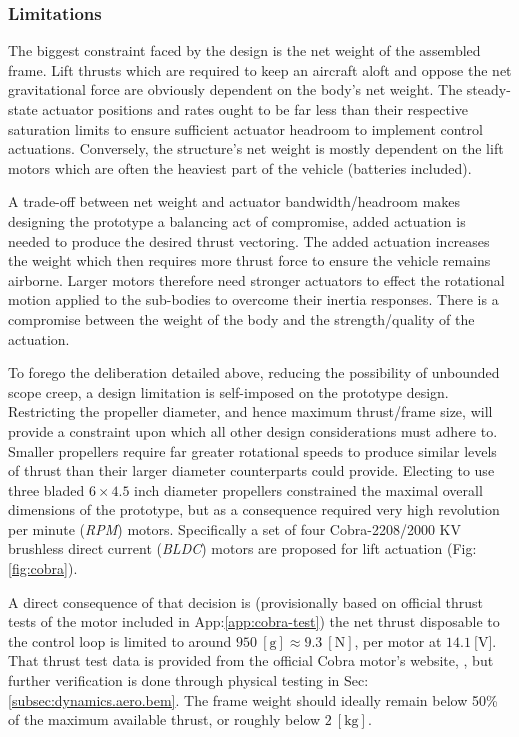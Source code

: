 \subsubsection{Limitations}
\label{subsubsec:intro.foreword.limits}
The biggest constraint faced by the design is the net weight of the assembled frame. Lift thrusts which are required to keep an aircraft aloft and oppose the net gravitational force are obviously dependent on the body's net weight. The steady-state actuator positions and rates ought to be far less than their respective saturation limits to ensure sufficient actuator headroom to implement control actuations. Conversely, the structure's net weight is mostly dependent on the lift motors which are often the heaviest part of the vehicle (batteries included). 
\par
A trade-off between net weight and actuator bandwidth/headroom makes designing the prototype a balancing act of compromise, added actuation is needed to produce the desired thrust vectoring. The added actuation increases the weight which then requires more thrust force to ensure the vehicle remains airborne. Larger motors therefore need stronger actuators to effect the rotational motion applied to the sub-bodies to overcome their inertia responses. There is a compromise between the weight of the body and the strength/quality of the actuation.
\par
To forego the deliberation detailed above, reducing the possibility of unbounded scope creep, a design limitation is self-imposed on the prototype design. Restricting the propeller diameter, and hence maximum thrust/frame size, will provide a constraint upon which all other design considerations must adhere to. Smaller propellers require far greater rotational speeds to produce similar levels of thrust than their larger diameter counterparts could provide. Electing to use three bladed $6\times 4.5$ inch diameter propellers constrained the maximal overall dimensions of the prototype, but as a consequence required very high revolution per minute (\emph{RPM}) motors. Specifically a set of four Cobra-2208/2000 KV \cite{cobramotor} brushless direct current (\emph{BLDC}) motors are proposed for lift actuation (Fig:\ref{fig:cobra}). 
\par
A direct consequence of that decision is (provisionally based on official thrust tests of the motor included in App:\ref{app:cobra-test}) the net thrust disposable to the control loop is limited to around $950~[\text{g}]\approx 9.3~[\text{N}]$, per motor at $14.1~[\text{V}$]. That thrust test data is provided from the official Cobra motor's website, \cite{cobramotor}, but further verification is done through physical testing in Sec:\ref{subsec:dynamics.aero.bem}. The frame weight should ideally remain below 50\% of the maximum available thrust, or roughly below $2~[\text{kg}]$.
